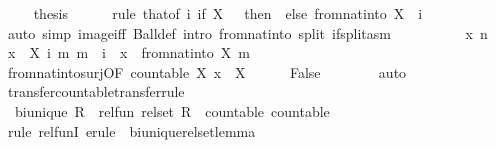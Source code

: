 \begin{isabellebody}
%
\isadelimproof
%
\endisadelimproof
%
\isatagproof
{}\isamarkupfalse%
\ {\isacharminus}\ \ \isamarkupfalse%
\ thesis\isanewline
\ \ \ \ \isamarkupfalse%
\ {\isacharparenleft}rule\ that{\isacharbrackleft}of\ {\isachardoublequoteopen}{\isasymlambda}i{\isachardot}\ if\ X\ {\isacharequal}\ {\isacharbraceleft}{\isacharbraceright}\ then\ {\isacharbraceleft}{\isacharbraceright}\ else\ from{\isacharunderscore}nat{\isacharunderscore}into\ X\ {\isacharbackquote}\ {\isacharbraceleft}{\isachardot}{\isachardot}i{\isacharbraceright}{\isachardoublequoteclose}{\isacharbrackright}{\isacharparenright}\isanewline
\ \ \ \ \isamarkupfalse%
\ {\isacharparenleft}auto\ simp{\isacharcolon}\ image{\isacharunderscore}iff\ Ball{\isacharunderscore}def\ intro{\isacharcolon}\ from{\isacharunderscore}nat{\isacharunderscore}into\ split{\isacharcolon}\ if{\isacharunderscore}split{\isacharunderscore}asm{\isacharparenright}\isanewline
\ \ \isamarkupfalse%
\ {\isacharminus}\isanewline
\ \ \ \ \isamarkupfalse%
\ x\ n\ \isamarkupfalse%
\ {\isachardoublequoteopen}x\ {\isasymin}\ X{\isachardoublequoteclose}\ {\isachardoublequoteopen}{\isasymforall}i\ m{\isachardot}\ m\ {\isasymle}\ i\ {\isasymlongrightarrow}\ x\ {\isasymnoteq}\ from{\isacharunderscore}nat{\isacharunderscore}into\ X\ m{\isachardoublequoteclose}\isanewline
\ \ \ \ \isamarkupfalse%
\ from{\isacharunderscore}nat{\isacharunderscore}into{\isacharunderscore}surj{\isacharbrackleft}OF\ {\isacartoucheopen}countable\ X{\isacartoucheclose}\ {\isacartoucheopen}x\ {\isasymin}\ X{\isacartoucheclose}{\isacharbrackright}\isanewline
\ \ \ \ \isamarkupfalse%
\ False\isanewline
\ \ \ \ \ \ \isamarkupfalse%
\ auto\isanewline
\ \ \isamarkupfalse%
\isanewline
{}\isamarkupfalse%
%
\endisatagproof
{\isafoldproof}%
%
\isadelimproof
\isanewline
%
\endisadelimproof
\isanewline
{}\isamarkupfalse%
\ transfer{\isacharunderscore}countable{\isacharbrackleft}transfer{\isacharunderscore}rule{\isacharbrackright}{\isacharcolon}\isanewline
\ \ {\isachardoublequoteopen}bi{\isacharunderscore}unique\ R\ {\isasymLongrightarrow}\ rel{\isacharunderscore}fun\ {\isacharparenleft}rel{\isacharunderscore}set\ R{\isacharparenright}\ {\isacharparenleft}{\isacharequal}{\isacharparenright}\ countable\ countable{\isachardoublequoteclose}\isanewline
%
\isadelimproof
\ \ %
\endisadelimproof
%
\isatagproof
{}\isamarkupfalse%
\ {\isacharparenleft}rule\ rel{\isacharunderscore}funI{\isacharcomma}\ erule\ {\isacharparenleft}{}{\isacharparenright}\ bi{\isacharunderscore}unique{\isacharunderscore}rel{\isacharunderscore}set{\isacharunderscore}lemma{\isacharparenright}\isanewline

\end{isabellebody}
